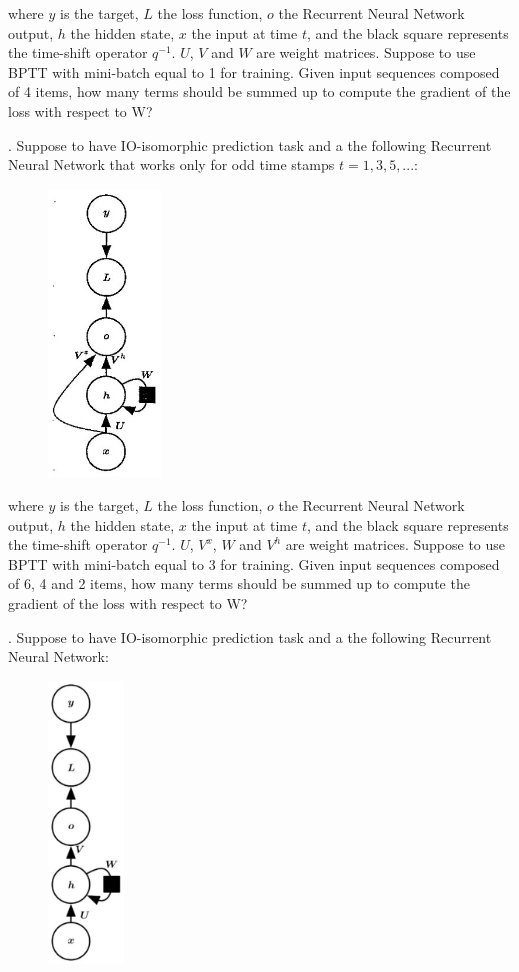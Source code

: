 where $y$ is the target, $L$ the loss function, $o$ the Recurrent Neural Network output, $h$ the hidden state, $x$ the input at time $t$, and the black square represents the time-shift operator $q^{-1}$. $U$, $V$ and $W$ are weight matrices. Suppose to use BPTT with mini-batch equal to 1 for training. Given input sequences composed of 4 items, how many terms should be summed up to compute the gradient of the loss with respect to W?


. Suppose to have IO-isomorphic prediction task and a the following Recurrent Neural Network that works only for odd time stamps $t=1, 3, 5, ...$:

\begin{figure}[h]
    \centering
    \includegraphics[width=3cm]{Images/io-isomorphic-rnn.jpg}
    \label{fig:io-rnn}
\end{figure}

where $y$ is the target, $L$ the loss function, $o$ the Recurrent Neural Network output, $h$ the hidden state, $x$ the input at time $t$, and the black square represents the time-shift operator $q^{-1}$. $U$, $V^{x}$, $W$ and $V^{h}$ are weight matrices. Suppose to use BPTT with mini-batch equal to 3 for training. Given input sequences composed of 6, 4 and 2 items, how many terms should be summed up to compute the gradient of the loss with respect to W?

\newpage
{}. Suppose to have IO-isomorphic prediction task and a the following Recurrent Neural Network:

\begin{figure}[h]
    \centering
    \includegraphics[width=2cm]{Images/io-isomorphic-rnn2.jpg}
    \label{fig:io-rnn2}
\end{figure}

